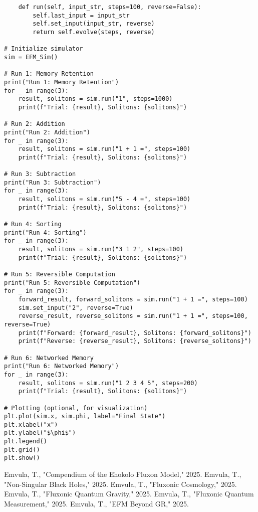 \documentclass[11pt]{article}
\begin{document}
\begin{lstlisting}
    def run(self, input_str, steps=100, reverse=False):
        self.last_input = input_str
        self.set_input(input_str, reverse)
        return self.evolve(steps, reverse)

# Initialize simulator
sim = EFM_Sim()

# Run 1: Memory Retention
print("Run 1: Memory Retention")
for _ in range(3):
    result, solitons = sim.run("1", steps=1000)
    print(f"Trial: {result}, Solitons: {solitons}")

# Run 2: Addition
print("Run 2: Addition")
for _ in range(3):
    result, solitons = sim.run("1 + 1 =", steps=100)
    print(f"Trial: {result}, Solitons: {solitons}")

# Run 3: Subtraction
print("Run 3: Subtraction")
for _ in range(3):
    result, solitons = sim.run("5 - 4 =", steps=100)
    print(f"Trial: {result}, Solitons: {solitons}")

# Run 4: Sorting
print("Run 4: Sorting")
for _ in range(3):
    result, solitons = sim.run("3 1 2", steps=100)
    print(f"Trial: {result}, Solitons: {solitons}")

# Run 5: Reversible Computation
print("Run 5: Reversible Computation")
for _ in range(3):
    forward_result, forward_solitons = sim.run("1 + 1 =", steps=100)
    sim.set_input("2", reverse=True)
    reverse_result, reverse_solitons = sim.run("1 + 1 =", steps=100, reverse=True)
    print(f"Forward: {forward_result}, Solitons: {forward_solitons}")
    print(f"Reverse: {reverse_result}, Solitons: {reverse_solitons}")

# Run 6: Networked Memory
print("Run 6: Networked Memory")
for _ in range(3):
    result, solitons = sim.run("1 2 3 4 5", steps=200)
    print(f"Trial: {result}, Solitons: {solitons}")

# Plotting (optional, for visualization)
plt.plot(sim.x, sim.phi, label="Final State")
plt.xlabel("x")
plt.ylabel("$\phi$")
plt.legend()
plt.grid()
plt.show()
\end{lstlisting}




\begin{thebibliography}{9}
 Emvula, T., "Compendium of the Ehokolo Fluxon Model," 2025.
 Emvula, T., "Non-Singular Black Holes," 2025.
 Emvula, T., "Fluxonic Cosmology," 2025.
 Emvula, T., "Fluxonic Quantum Gravity," 2025.
 Emvula, T., "Fluxonic Quantum Measurement," 2025.
 Emvula, T., "EFM Beyond GR," 2025.
\end{thebibliography}
\end{document}

